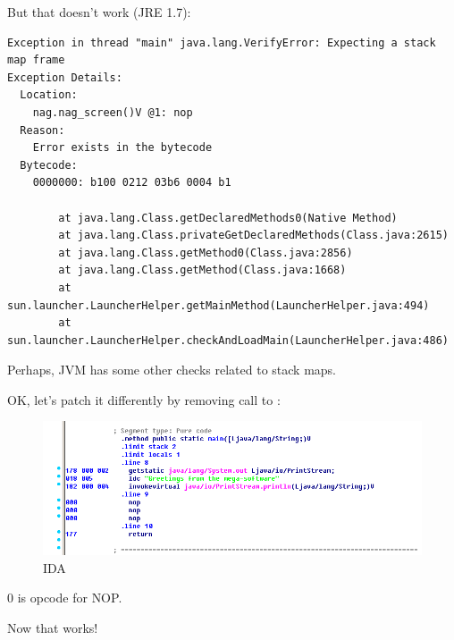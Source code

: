 But that doesn't work (JRE 1.7):

\begin{lstlisting}
Exception in thread "main" java.lang.VerifyError: Expecting a stack map frame
Exception Details:
  Location:
    nag.nag_screen()V @1: nop
  Reason:
    Error exists in the bytecode
  Bytecode:
    0000000: b100 0212 03b6 0004 b1

        at java.lang.Class.getDeclaredMethods0(Native Method)
        at java.lang.Class.privateGetDeclaredMethods(Class.java:2615)
        at java.lang.Class.getMethod0(Class.java:2856)
        at java.lang.Class.getMethod(Class.java:1668)
        at sun.launcher.LauncherHelper.getMainMethod(LauncherHelper.java:494)
        at sun.launcher.LauncherHelper.checkAndLoadMain(LauncherHelper.java:486)
\end{lstlisting}

Perhaps, JVM has some other checks related to stack maps.

OK, let's patch it differently by removing call to :

\begin{figure}[H]
\centering
\includegraphics[scale=\FigScale]{Java_and_NET/java/13_patching/1/3.png}
\caption{IDA}
\end{figure}

0 is opcode for \ac{NOP}.

Now that works!
